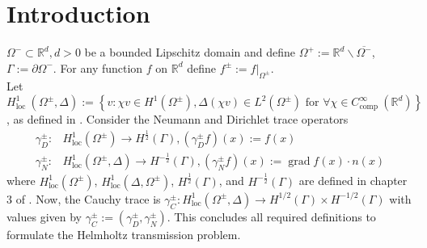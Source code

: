 \documentclass[12pt,journal,compsoc, onecolumn]{IEEEtran}
\begin{document}
\section{Introduction}
\label{section:introduction}
 \(\Omega^- \subset \mathbb{R}^d, d > 0\) be a bounded Lipschitz domain and 
define \(\Omega^{+}:=\mathbb{R}^{d} \backslash \overline{\Omega^{-}}\), 
\(\Gamma := \partial \Omega^-\).
For any function $f$ on $\mathbb{R}^d$ define $f^\pm :=f|_{\Omega^{\pm}}$. \\
Let \(H_{\text {loc }}^{1}\left(\Omega^{\pm}, \Delta\right):=\left\{v: \chi v \in H^{1}\left(\Omega^{\pm}\right), \Delta(\chi v) \in L^{2}\left(\Omega^{\pm}\right) \text{ for } \forall\chi \in C_{\text {comp }}^{\infty}\left(\mathbb{R}^{d}\right)\right\}\), as defined in \cite{hiptmair2021spurious}.
Consider the Neumann and Dirichlet trace operators 
\begin{align}
    \gamma_{D}^{\pm}: & H_{\mathrm{loc}}^{1}\left(\Omega^{\pm}\right) \rightarrow H^{\frac{1}{2}}(\Gamma), \left(\gamma_{D}^{\pm} f\right)({x}):=f({x}) \nonumber \\
    \gamma_{N}^{\pm}: & H_{\mathrm{loc}}^1\left(\Omega^{\pm}, \Delta\right) \rightarrow H^{-\frac{1}{2}}(\Gamma), \left(\gamma_{N}^{\pm} f\right)({x}):=\operatorname{grad} f({x}) \cdot {n}({x}) \nonumber
\end{align}
where \(H_{\mathrm{loc}}^{1}\left(\Omega^{\pm}\right)\),
\(H^1_{\mathrm{loc}}\left(\Delta, \Omega^{\pm}\right)\), 
\(H^{\frac{1}{2}}(\Gamma)\), and \(H^{-\frac{1}{2}}(\Gamma)\)
are defined in chapter 3 of  \cite{mclean2000strongly}.
Now, the Cauchy trace is \(\gamma_{C}^{\pm}: H_{\mathrm{loc}}^{1}\left(\Omega^{\pm}, \Delta\right) \rightarrow H^{1 / 2}(\Gamma) \times H^{-1 / 2}(\Gamma)\) with values given 
by \(\gamma_{C}^{\pm}:=\left(\gamma_{D}^{\pm}, \gamma_{N}^{\pm}\right)\). 
This concludes all required definitions to formulate the Helmholtz transmission problem.
\end{document}
